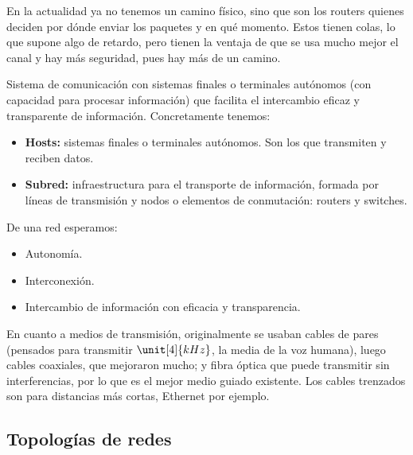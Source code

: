 En la actualidad ya no tenemos un camino físico, sino que son los routers quienes deciden por dónde enviar los paquetes y en qué momento. Estos tienen colas, lo que supone algo de retardo, pero tienen la ventaja de que se usa mucho mejor el canal y hay más seguridad, pues hay más de un camino.\\ 



\begin{definicion}[Red]
    Sistema de comunicación con sistemas finales o terminales autónomos (con capacidad para procesar información) que facilita el intercambio eficaz y transparente de información. Concretamente tenemos:
    \begin{itemize}
        \item\textbf{Hosts:} sistemas finales o terminales autónomos. Son los que transmiten y reciben datos. 
        \item\textbf{Subred:} infraestructura para el transporte de información, formada por líneas de transmisión y nodos o elementos de conmutación: routers y switches.   
    \end{itemize}
\end{definicion}

De una red esperamos:
\begin{itemize}
    \item Autonomía.
    \item Interconexión.
    \item Intercambio de información con eficacia y transparencia. 
\end{itemize}

En cuanto a medios de transmisión, originalmente se usaban cables de pares (pensados para transmitir $\unit[4]{kHz}$, la media de la voz humana), luego cables coaxiales, que mejoraron mucho; y fibra óptica que puede transmitir sin interferencias, por lo que es el mejor medio guiado existente. Los cables trenzados son para distancias más cortas, Ethernet por ejemplo. 

\subsection{Topologías de redes}

